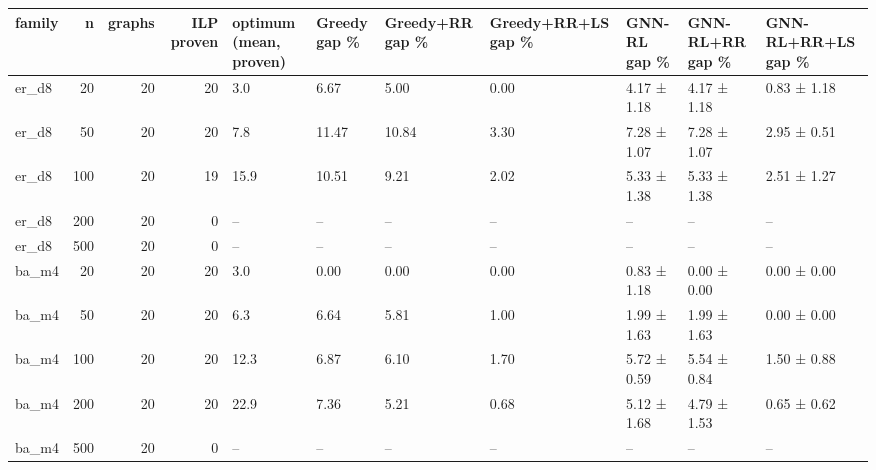 \begin{tabular}{lrrrlllllll}
\toprule
family & n & graphs & ILP proven & optimum (mean, proven) & Greedy gap \% & Greedy+RR gap \% & Greedy+RR+LS gap \% & GNN-RL gap \% & GNN-RL+RR gap \% & GNN-RL+RR+LS gap \% \\
\midrule
er\_d8 & 20 & 20 & 20 & 3.0 & 6.67 & 5.00 & 0.00 & 4.17 ± 1.18 & 4.17 ± 1.18 & 0.83 ± 1.18 \\
er\_d8 & 50 & 20 & 20 & 7.8 & 11.47 & 10.84 & 3.30 & 7.28 ± 1.07 & 7.28 ± 1.07 & 2.95 ± 0.51 \\
er\_d8 & 100 & 20 & 19 & 15.9 & 10.51 & 9.21 & 2.02 & 5.33 ± 1.38 & 5.33 ± 1.38 & 2.51 ± 1.27 \\
er\_d8 & 200 & 20 & 0 & -- & -- & -- & -- & -- & -- & -- \\
er\_d8 & 500 & 20 & 0 & -- & -- & -- & -- & -- & -- & -- \\
ba\_m4 & 20 & 20 & 20 & 3.0 & 0.00 & 0.00 & 0.00 & 0.83 ± 1.18 & 0.00 ± 0.00 & 0.00 ± 0.00 \\
ba\_m4 & 50 & 20 & 20 & 6.3 & 6.64 & 5.81 & 1.00 & 1.99 ± 1.63 & 1.99 ± 1.63 & 0.00 ± 0.00 \\
ba\_m4 & 100 & 20 & 20 & 12.3 & 6.87 & 6.10 & 1.70 & 5.72 ± 0.59 & 5.54 ± 0.84 & 1.50 ± 0.88 \\
ba\_m4 & 200 & 20 & 20 & 22.9 & 7.36 & 5.21 & 0.68 & 5.12 ± 1.68 & 4.79 ± 1.53 & 0.65 ± 0.62 \\
ba\_m4 & 500 & 20 & 0 & -- & -- & -- & -- & -- & -- & -- \\
\bottomrule
\end{tabular}
